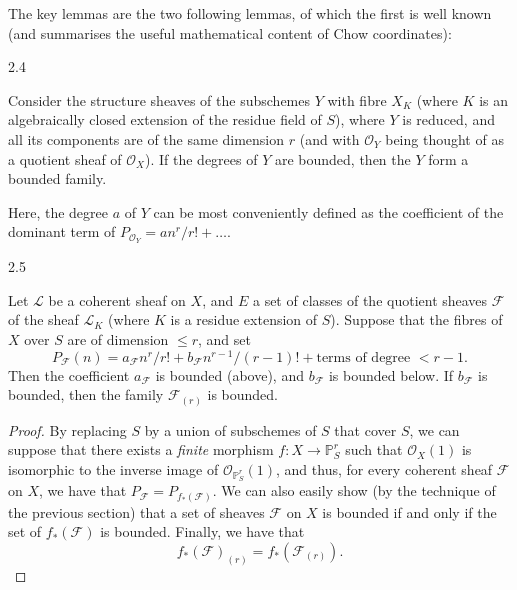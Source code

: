  The key lemmas are the two following lemmas, of which the first is well known (and summarises the useful mathematical content of Chow coordinates):\begin{lemma}{2.4}\label{fga3.iv-2-lemma-2.4}\skipsinglepar\par{}Consider the structure sheaves of the subschemes \(Y\) with fibre \(X_K\) (where \(K\) is an algebraically closed extension of the residue field of \(S\)), where \(Y\) is reduced, and all its components are of the same dimension \(r\) (and with \(\mathcal {O}_Y\) being thought of as a quotient sheaf of \(\mathcal {O}_X\)).
    If the degrees of \(Y\) are bounded, then the \(Y\) form a bounded family.\end{lemma}\par{}Here, the degree \(a\) of \(Y\) can be most conveniently defined as the coefficient of the dominant term of \(P_{\mathcal {O}_Y}=an^r/r!+\ldots \).\begin{lemma}{2.5}\label{fga3.iv-2-lemma-2.5}\skipsinglepar\par{}Let \(\mathscr {L}\) be a coherent sheaf on \(X\), and \(E\) a set of classes of the quotient sheaves \(\mathscr {F}\) of the sheaf \(\mathscr {L}_K\) (where \(K\) is a residue extension of \(S\)).
    Suppose that the fibres of \(X\) over \(S\) are of dimension \(\leqslant  r\), and set
    \[       P_\mathscr {F}(n)       = a_\mathscr {F}n^r/r! + b_\mathscr {F}n^{r-1}/(r-1)! + \text {terms of degree }<r-1.     \]
    Then the coefficient \(a_\mathscr {F}\) is bounded (above), and \(b_\mathscr {F}\) is bounded below.
    If \(b_\mathscr {F}\) is bounded, then the family \(\mathscr {F}_{(r)}\) is bounded.\begin{proof}\par{}By replacing \(S\) by a union of subschemes of \(S\) that cover \(S\), we can suppose that there exists a \emph{finite} morphism \(f\colon  X\to \mathbb {P}_S^r\) such that \(\mathcal {O}_X(1)\) is isomorphic to the inverse image of \(\mathcal {O}_{\mathbb {P}_S^r}(1)\), and thus, for every coherent sheaf \(\mathscr {F}\) on \(X\), we have that \(P_\mathscr {F}=P_{f_*(\mathscr {F})}\).
      We can also easily show (by the technique of the previous section) that a set of sheaves \(\mathscr {F}\) on \(X\) is bounded if and only if the set of \(f_*(\mathscr {F})\) is bounded.
      Finally, we have that
      \[         f_*(\mathscr {F})_{(r)}         = f_*(\mathscr {F}_{(r)}).       \]
      

\end{proof}
\end{lemma}
